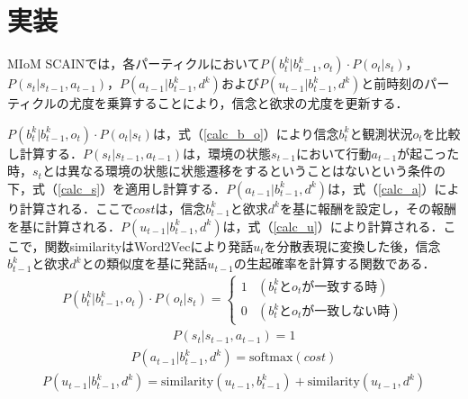 \section{実装}
\par
MIoM SCAINでは，各パーティクルにおいて$P(b_t^k|b_{t-1}^k,o_t)\cdot P(o_t|s_t)$，$P(s_t|s_{t-1},a_{t-1})$，$P(a_{t-1}|b_{t-1}^k,d^k)$および$P(u_{t-1}|b_{t-1}^k,d^k)$と前時刻のパーティクルの尤度を乗算することにより，信念と欲求の尤度を更新する．
\par
$P(b_t^k|b_{t-1}^k,o_t)\cdot P(o_t|s_t)$は，式（\ref{calc_b_o}）により信念$b_t^k$と観測状況$o_t$を比較し計算する．$P(s_t|s_{t-1},a_{t-1})$は，環境の状態$s_{t-1}$において行動$a_{t-1}$が起こった時，$s_t$とは異なる環境の状態に状態遷移をするということはないという条件の下，式（\ref{calc_s}）を適用し計算する．$P(a_{t-1}|b_{t-1}^k,d^k)$は，式（\ref{calc_a}）により計算される．ここで$cost$は，信念$b_{t-1}^k$と欲求$d^k$を基に報酬を設定し，その報酬を基に計算される．$P(u_{t-1}|b_{t-1}^k,d^k)$は，式（\ref{calc_u}）により計算される．ここで，関数similarityはWord2Vec\cite{mikolov2013efficient}により発話$u_t$を分散表現に変換した後，信念$b_{t-1}^k$と欲求$d^k$との類似度を基に発話$u_{t-1}$の生起確率を計算する関数である．
\begin{equation}
  \begin{split}
  \label{calc_b_o}
  P(b_t^k|b_{t-1}^k,o_t)\cdot P(o_t|s_t)=
  \begin{cases}
    1 & (b_t^kとo_tが一致する時) \\
    0 & (b_t^kとo_tが一致しない時)
  \end{cases}
  \end{split}
\end{equation}
\begin{equation}
  \begin{split}
  \label{calc_s}
  P(s_t|s_{t-1},a_{t-1})=1
  \end{split}
\end{equation}
\begin{equation}
  \begin{split}
  \label{calc_a}
  P(a_{t-1}|b_{t-1}^k,d^k)=\mathrm{softmax}(cost)
  \end{split}
\end{equation}
\begin{equation}
  \begin{split}
  \label{calc_u}
  P(u_{t-1}|b_{t-1}^k,d^k)=\mathrm{similarity}(u_{t-1},b_{t-1}^k)+\mathrm{similarity}(u_{t-1},d^k)
  \end{split}
\end{equation}
